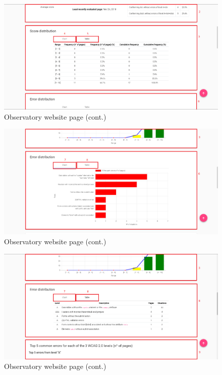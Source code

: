 \begin{figure}[H]
    \centering
    \includegraphics[width=\linewidth]{lib/images/observatory/observatory_website_page_score_table.png}
    \caption{Observatory website page (cont.)}
    \label{fig:obs_website_page_score_table}
\end{figure}

\begin{figure}[H]
    \centering
    \includegraphics[width=\linewidth]{lib/images/observatory/observatory_website_page_error_graph.png}
    \caption{Observatory website page (cont.)}
    \label{fig:obs_website_page_error_graph}
\end{figure}

\begin{figure}[H]
    \centering
    \includegraphics[width=\linewidth]{lib/images/observatory/observatory_website_page_error_table.png}
    \caption{Observatory website page (cont.)}
    \label{fig:obs_website_page_error_table}
\end{figure}


